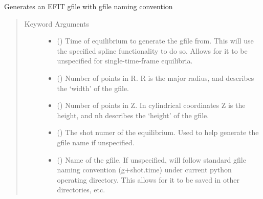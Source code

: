 \documentclass[letterpaper,10pt,english]{sphinxmanual}
\begin{document}
\begin{fulllineitems}
\begin{fulllineitems}
\end{fulllineitems}


\begin{fulllineitems}
\label{\detokenize{eqtools:eqtools.core.Equilibrium.gfile}}
Generates an EFIT gfile with gfile naming convention
\begin{quote}\begin{description}
\item[{Keyword Arguments}] \leavevmode\begin{itemize}
\item {} 
 () \textendash{} Time of equilibrium to
generate the gfile from. This will use the specified
spline functionality to do so. Allows for it to be
unspecified for single-time-frame equilibria.

\item {} 
 () \textendash{} Number of points in R.
R is the major radius, and describes the ‘width’ of the
gfile.

\item {} 
 () \textendash{} Number of points in Z. In cylindrical
coordinates Z is the height, and nh describes the ‘height’
of the gfile.

\item {} 
 () \textendash{} The shot numer of the equilibrium.
Used to help generate the gfile name if unspecified.

\item {} 
 () \textendash{} Name of the gfile.  If unspecified, will follow
standard gfile naming convention (g+shot.time) under current
python operating directory.  This allows for it to be saved
in other directories, etc.


\end{itemize}
\end{description}
\end{quote}
\end{fulllineitems}
\end{fulllineitems}
\end{document}
